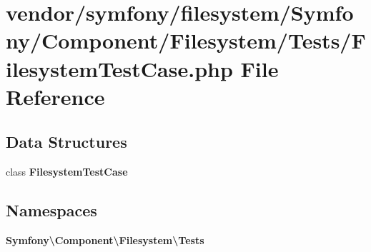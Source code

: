 \section{vendor/symfony/filesystem/\+Symfony/\+Component/\+Filesystem/\+Tests/\+Filesystem\+Test\+Case.php File Reference}
\label{_filesystem_test_case_8php}
\subsection*{Data Structures}
\begin{DoxyCompactItemize}
\item 
class {\bf Filesystem\+Test\+Case}
\end{DoxyCompactItemize}
\subsection*{Namespaces}
\begin{DoxyCompactItemize}
\item 
 {\bf Symfony\textbackslash{}\+Component\textbackslash{}\+Filesystem\textbackslash{}\+Tests}
\end{DoxyCompactItemize}
